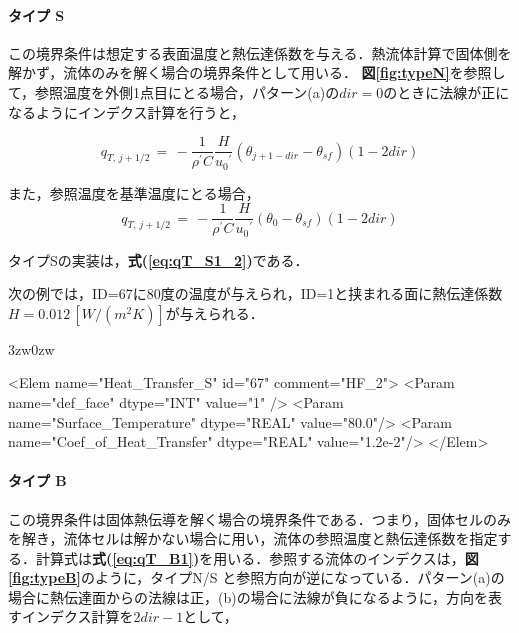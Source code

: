 %
\paragraph{タイプ S}
この境界条件は想定する表面温度と熱伝達係数を与える．熱流体計算で固体側を解かず，流体のみを解く場合の境界条件として用いる．
\textbf{図\ref{fig:typeN}}を参照して，参照温度を外側1点目にとる場合，パターン(a)の$dir=0$のときに法線が正になるようにインデクス計算を行うと，

\begin{equation}
q_{T,\,j+1/2} \,=\, - \frac{1}{\rho^{\prime}C} \frac{H}{{u_{\mathit{0}}}^{\prime}} \left( \theta_{j+1-dir} -\theta_{sf} \right) \left( 1-2{dir} \right)
\label{eq:qT_S1}
\end{equation}

\noindent また，参照温度を基準温度にとる場合，
\begin{equation}
q_{T,\,j+1/2} \,=\, - \frac{1}{\rho^{\prime}C} \frac{H}{{u_{\mathit{0}}}^{\prime}} \left( \theta_0 -\theta_{sf} \right) \left( 1-2{dir} \right)
\label{eq:qT_S1_2}
\end{equation}

\noindent タイプSの実装は，\textbf{式(\ref{eq:qT_S1_2})}である．

次の例では，ID=67に80度の温度が与えられ，ID=1と挟まれる面に熱伝達係数$H=0.012\, [W/(m^{2}K)]$が与えられる．

\begin{indentation}{3zw}{0zw}
{
\small
\begin{program}
<Elem name="Heat_Transfer_S" id="67"  comment="HF_2">
  <Param name="def_face"    dtype="INT"    value="1" />
  <Param name="Surface_Temperature" dtype="REAL" value="80.0"/>
  <Param name="Coef_of_Heat_Transfer" dtype="REAL" value="1.2e-2"/>
</Elem>
\end{program}
}
\end{indentation}

%
\paragraph{タイプ B}
この境界条件は固体熱伝導を解く場合の境界条件である．つまり，固体セルのみを解き，流体セルは解かない場合に用い，流体の参照温度と熱伝達係数を指定する．計算式は\textbf{式(\ref{eq:qT_B1})}を用いる．参照する流体のインデクスは，\textbf{図\ref{fig:typeB}}のように，タイプN/S と参照方向が逆になっている．パターン(a)の場合に熱伝達面からの法線は正，(b)の場合に法線が負になるように，方向を表すインデクス計算を$2dir-1$として，

